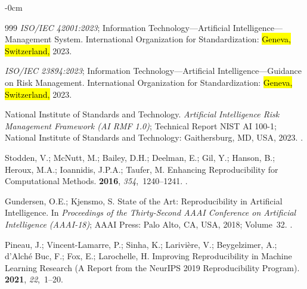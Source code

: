 \documentclass[systems,article,accept,moreauthors,pdftex]{Definitions/mdpi}
\begin{document}
\begin{adjustwidth}{-\extralength}{0cm}
\begin{thebibliography}{999}
\emph{{ISO/IEC} 42001:2023}; Information Technology---Artificial
  Intelligence---Management System.
\newblock International Organization for Standardization: \hl{Geneva, Switzerland,} %
  2023.

\emph{{ISO/IEC} 23894:2023}; Information Technology---Artificial
  Intelligence---Guidance on Risk Management.
\newblock International Organization for Standardization: \hl{Geneva, Switzerland,}  2023.

{National Institute of Standards and Technology}.
\newblock \emph{Artificial Intelligence Risk Management Framework ({AI RMF} 1.0)};
\newblock Technical Report NIST AI 100-1; National Institute of Standards and
  Technology: Gaithersburg, MD, USA,  2023.
.


Stodden, V.; McNutt, M.; Bailey, D.H.; Deelman, E.; Gil, Y.; Hanson, B.;
  Heroux, M.A.; Ioannidis, J.P.A.; Taufer, M.
\newblock Enhancing Reproducibility for Computational Methods.
 {\bf 2016}, {\em 354},~1240--1241.
.

Gundersen, O.E.; Kjensmo, S.
\newblock State of the Art: Reproducibility in Artificial Intelligence.
\newblock In \emph{Proceedings of the  Thirty-Second AAAI
  Conference on Artificial Intelligence (AAAI-18)}; AAAI Press: Palo Alto, CA, USA, 2018;
  Volume~32.
.

Pineau, J.; Vincent-Lamarre, P.; Sinha, K.; Larivi{\`e}re, V.; Beygelzimer, A.;
  d'Alch{\'e} Buc, F.; Fox, E.; Larochelle, H.
\newblock Improving Reproducibility in Machine Learning Research (A Report from
  the {NeurIPS} 2019 Reproducibility Program).
 {\bf 2021}, {\em
  22},~1--20.


\end{thebibliography}
\end{adjustwidth}
\end{document}
